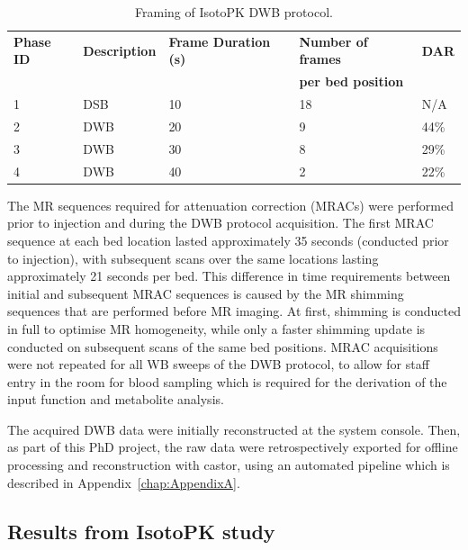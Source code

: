 \begin{table}[h!]
\centering
\caption{Framing of IsotoPK DWB protocol.}
\label{tab:IsotoPK_Framing}
\begin{tabular}{|l|l|l|l|l|}
\toprule
\textbf{Phase ID} & \textbf{Description}              & \textbf{Frame Duration (s)} & \textbf{Number of frames} & \textbf{DAR} \\
\textbf{} & \textbf{} & \textbf{} & \textbf{per bed position} & \textbf{} \\
\midrule
1        & DSB & 10                 & 18        & N/A                 \\
2        & DWB                      & 20                 & 9         & 44\%                \\
3        & DWB                      & 30                 & 8         & 29\%                \\
4        & DWB                      & 40                 & 2         & 22\%                \\
\bottomrule
\end{tabular}
\end{table}

The MR sequences required for attenuation correction (MRACs) were performed prior to injection and during the DWB protocol acquisition. The first MRAC sequence at each bed location lasted approximately 35 seconds (conducted prior to injection), with subsequent scans over the same locations lasting approximately 21 seconds per bed. This difference in time requirements between initial and subsequent MRAC sequences is caused by the MR shimming sequences that are performed before MR imaging. At first, shimming is conducted in full to optimise MR homogeneity, while only a faster shimming update is conducted on subsequent scans of the same bed positions.
MRAC acquisitions were not repeated for all WB sweeps of the DWB protocol, to allow for staff entry in the room for blood sampling which is required for the derivation of the input function and metabolite analysis. 

The acquired DWB data were initially reconstructed at the system console.
Then, as part of this PhD project, the raw data were retrospectively exported for offline processing and reconstruction with \gls{castor}, using an automated pipeline which is described in Appendix~\ref{chap:AppendixA}.

\subsection{Results from IsotoPK study}

